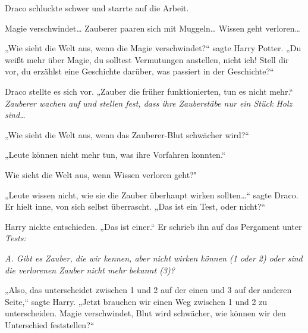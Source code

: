 Draco schluckte schwer und starrte auf die Arbeit.

Magie verschwindet… Zauberer paaren sich mit Muggeln… Wissen geht verloren…

„Wie sieht die Welt aus, wenn die Magie verschwindet?“ sagte Harry Potter. „Du weißt mehr über Magie, du solltest Vermutungen anstellen, nicht ich! Stell dir vor, du erzählst eine Geschichte darüber, was passiert in der Geschichte?“

Draco stellte es sich vor. „Zauber die früher funktionierten, tun es nicht mehr.“ \emph{Zauberer wachen auf und stellen fest, dass ihre Zauberstäbe nur ein Stück Holz sind…}

„Wie sieht die Welt aus, wenn das Zauberer-Blut schwächer wird?“

„Leute können nicht mehr tun, was ihre Vorfahren konnten.“

Wie sieht die Welt aus, wenn Wissen verloren geht?"

„Leute wissen nicht, wie sie die Zauber überhaupt wirken sollten…“ sagte Draco. Er hielt inne, von sich selbst überrascht. „Das ist ein Test, oder nicht?“

Harry nickte entschieden. „Das ist einer.“ Er schrieb ihn auf das Pergament unter \emph{Tests:}

\emph{A. Gibt es Zauber, die wir kennen, aber nicht wirken können (1 oder 2) oder sind die verlorenen Zauber nicht mehr bekannt (3)?}

„Also, das unterscheidet zwischen 1 und 2 auf der einen und 3 auf der anderen Seite,“ sagte Harry. „Jetzt brauchen wir einen Weg zwischen 1 und 2 zu unterscheiden. Magie verschwindet, Blut wird schwächer, wie können wir den Unterschied feststellen?“

